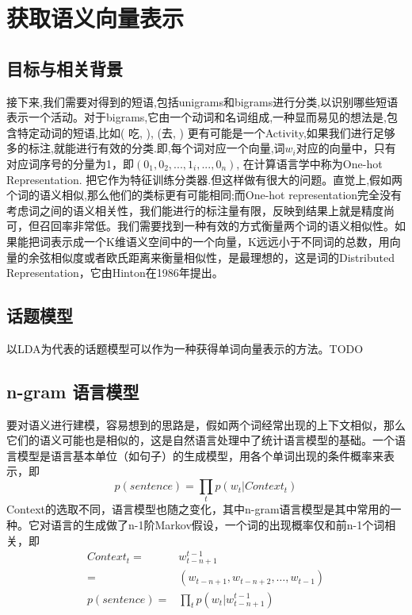 \section{获取语义向量表示}

\subsection{目标与相关背景}
接下来,我们需要对得到的短语,包括unigrams和bigrams进行分类,以识别哪些短语表示一个活动。对于bigrams,它由一个动词和名词组成,一种显而易见的想法是,包含特定动词的短语,比如( 吃, ), (去, ) 更有可能是一个Activity,如果我们进行足够多的标注,就能进行有效的分类.即,每个词对应一个向量,词$w_i$对应的向量中，只有对应词序号的分量为1，即$(0_1, 0_2, ... , 1_i, ... , 0_n)$, 在计算语言学中称为One-hot Representation. 把它作为特征训练分类器.但这样做有很大的问题。直觉上,假如两个词的语义相似,那么他们的类标更有可能相同;而One-hot representation完全没有考虑词之间的语义相关性，我们能进行的标注量有限，反映到结果上就是精度尚可，但召回率非常低。我们需要找到一种有效的方式衡量两个词的语义相似性。如果能把词表示成一个K维语义空间中的一个向量，K远远小于不同词的总数，用向量的余弦相似度或者欧氏距离来衡量相似性，是最理想的，这是词的Distributed Representation，它由Hinton在1986年提出\cite{hinton1986learning}。

\subsection{话题模型}
以LDA\cite{blei2003latent}为代表的话题模型可以作为一种获得单词向量表示的方法。TODO

\subsection{n-gram 语言模型}
要对语义进行建模，容易想到的思路是，假如两个词经常出现的上下文相似，那么它们的语义可能也是相似的，这是自然语言处理中了统计语言模型的基础。一个语言模型是语言基本单位（如句子）的生成模型，用各个单词出现的条件概率来表示，即
\[
p(sentence) = \prod\limits_t {p({w_t}|Context_t)}
\]
Context的选取不同，语言模型也随之变化，其中n-gram语言模型是其中常用的一种。它对语言的生成做了n-1阶Markov假设，一个词的出现概率仅和前n-1个词相关，即
\begin{align*}
Context_t = & w_{t-n+1}^{t-1} \\
		= & (w_{t-n+1}, w_{t-n+2}, \ldots, w_{t-1}) \\
p(sentence) = & \prod\limits_t {p({w_t}|w_{t-n+1}^{t-1})}
\end{align*}

